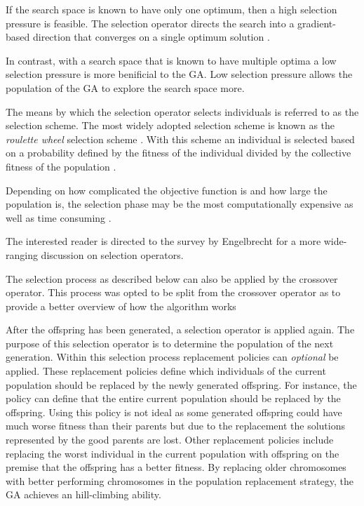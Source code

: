 If the search space is known to have only one optimum, then a high selection pressure is feasible\cite{ConstrainedGA}. The selection operator directs the search into a gradient-based direction that converges on a single optimum solution \cite{ConstrainedGA}. 

In contrast, with a search space that is known to have multiple optima a low selection pressure is more benificial to the GA\cite{ConstrainedGA}. Low selection pressure allows the population of the GA to explore the search space more\cite{ConstrainedGA}.

The means by which the selection operator selects individuals is referred to as the selection scheme. The most widely adopted selection scheme is known as the \emph{roulette wheel} selection scheme \cite{ConstrainedGA,GeostatisticalGA,HybridBaldwinGA,CoactiveFuzzyGA}. With this scheme an individual is selected based on a probability defined by the fitness of the individual divided by the collective fitness of the population \cite{GeostatisticalGA}.

Depending on how complicated the objective function is and how large the population is, the selection phase may be the most computationally expensive as well as time consuming \cite{AcceleratingGA}.

The interested reader is directed to the survey by Engelbrecht\cite{CompuIntelligenceIntro} for a more wide-ranging discussion on selection operators.

The selection process as described below  can also be applied by the crossover operator. This process was opted to be split from the crossover operator as to provide a better overview of how the algorithm works

After the offspring has been generated, a selection operator is applied again\cite{CompuIntelligenceIntro}. The purpose of this selection operator is to determine the population of the next generation\cite{CompuIntelligenceIntro}. Within this selection process replacement policies can \emph{optional} be applied\cite{CompuIntelligenceIntro}. These replacement policies define which individuals of the current population should be replaced by the newly generated offspring\cite{CompuIntelligenceIntro}. For instance, the policy can define that the entire current population should be replaced by the offspring\cite{CompuIntelligenceIntro}. Using this policy is not ideal as some generated offspring could have much worse fitness than their parents but due to the replacement the solutions represented by the good parents are lost\cite{CompuIntelligenceIntro}. Other replacement policies include replacing the worst individual in the current population with offspring on the premise that the offspring has a better fitness\cite{CompuIntelligenceIntro}. By replacing older chromosomes with better performing chromosomes in the population replacement strategy, the GA achieves an hill-climbing ability.

